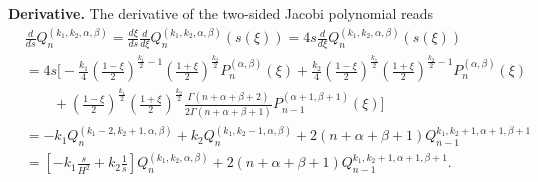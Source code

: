 \noindent \textbf{Derivative.} The derivative of the two-sided Jacobi polynomial reads
%
\begin{equation}
\begin{aligned}
    &\frac{d}{ds}Q_n^{(k_1, k_2, \alpha, \beta)} = \frac{d\xi}{ds} \frac{d}{d\xi} Q_n^{(k_1, k_2, \alpha, \beta)}(s(\xi)) = 4s \frac{d}{d\xi} Q_n^{(k_1, k_2, \alpha, \beta)}(s(\xi)) \\
    &= 4s \bigg[- \frac{k_1}{4} \left(\frac{1 - \xi}{2}\right)^{\frac{k_1}{2} - 1} \left(\frac{1 + \xi}{2}\right)^{\frac{k_2}{2}} P_n^{(\alpha, \beta)}(\xi) + \frac{k_2}{4} \left(\frac{1 - \xi}{2}\right)^{\frac{k_1}{2}} \left(\frac{1 + \xi}{2}\right)^{\frac{k_2}{2} - 1} P_n^{(\alpha, \beta)}(\xi) \\
    &\qquad + \left(\frac{1 - \xi}{2}\right)^{\frac{k_1}{2}} \left(\frac{1 + \xi}{2}\right)^{\frac{k_2}{2} } \frac{\Gamma(n + \alpha + \beta + 2)}{2 \Gamma(n + \alpha + \beta + 1)} P_{n-1}^{(\alpha+1, \beta+1)}(\xi)\bigg] \\[5pt] 
    &= -k_1 Q_n^{(k_1 - 2, k_2 + 1, \alpha, \beta)} + k_2 Q_n^{(k_1, k_2 - 1, \alpha, \beta)} + 2(n + \alpha + \beta + 1) Q_{n-1}^{k_1, k_2 + 1, \alpha + 1, \beta + 1} \\ 
    &= \left[-k_1 \frac{s}{H^2} + k_2\frac{1}{s}\right] Q_n^{(k_1, k_2, \alpha, \beta)} + 2(n + \alpha + \beta + 1) Q_{n-1}^{k_1, k_2 + 1, \alpha + 1, \beta + 1}.
\end{aligned}
\end{equation}
%
